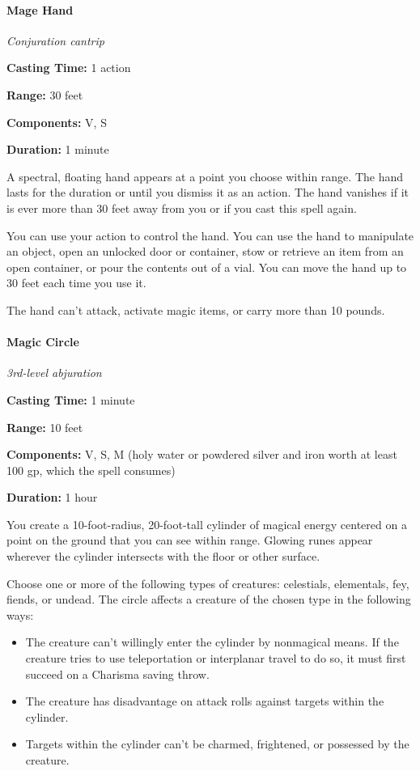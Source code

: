 \documentclass[
]{article}
\providecommand{\tightlist}{%
  \setlength{\itemsep}{0pt}\setlength{\parskip}{0pt}}
\begin{document}
\hypertarget{mage-hand}{%
\paragraph{Mage Hand}\label{mage-hand}}

\emph{Conjuration cantrip}

\textbf{Casting Time:} 1 action

\textbf{Range:} 30 feet

\textbf{Components:} V, S

\textbf{Duration:} 1 minute

A spectral, floating hand appears at a point you choose within range.
The hand lasts for the duration or until you dismiss it as an action.
The hand vanishes if it is ever more than 30 feet away from you or if
you cast this spell again.

You can use your action to control the hand. You can use the hand to
manipulate an object, open an unlocked door or container, stow or
retrieve an item from an open container, or pour the contents out of a
vial. You can move the hand up to 30 feet each time you use it.

The hand can't attack, activate magic items, or carry more than 10
pounds.

\hypertarget{magic-circle}{%
\paragraph{Magic Circle}\label{magic-circle}}

\emph{3rd-level abjuration}

\textbf{Casting Time:} 1 minute

\textbf{Range:} 10 feet

\textbf{Components:} V, S, M (holy water or powdered silver and iron
worth at least 100 gp, which the spell consumes)

\textbf{Duration:} 1 hour

You create a 10-foot-radius, 20-foot-tall cylinder of magical energy
centered on a point on the ground that you can see within range. Glowing
runes appear wherever the cylinder intersects with the floor or other
surface.

Choose one or more of the following types of creatures: celestials,
elementals, fey, fiends, or undead. The circle affects a creature of the
chosen type in the following ways:

\begin{itemize}
\tightlist
\item
  The creature can't willingly enter the cylinder by nonmagical means.
  If the creature tries to use teleportation or interplanar travel to do
  so, it must first succeed on a Charisma saving throw.
\item
  The creature has disadvantage on attack rolls against targets within
  the cylinder.
\item
  Targets within the cylinder can't be charmed, frightened, or possessed
  by the creature.
\end{itemize}
\end{document}
